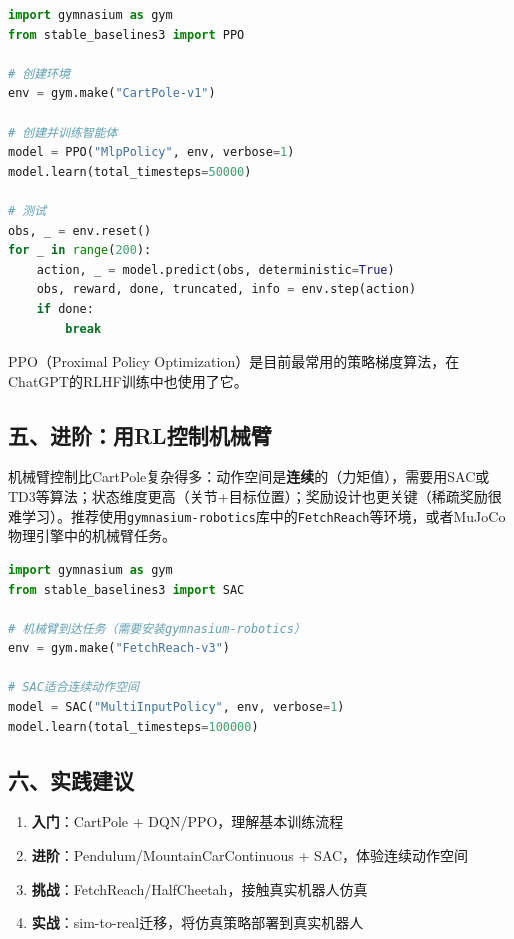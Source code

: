 \begin{lstlisting}[language=Python]
import gymnasium as gym
from stable_baselines3 import PPO

# 创建环境
env = gym.make("CartPole-v1")

# 创建并训练智能体
model = PPO("MlpPolicy", env, verbose=1)
model.learn(total_timesteps=50000)

# 测试
obs, _ = env.reset()
for _ in range(200):
    action, _ = model.predict(obs, deterministic=True)
    obs, reward, done, truncated, info = env.step(action)
    if done:
        break
\end{lstlisting}

PPO（Proximal Policy Optimization）是目前最常用的策略梯度算法，在ChatGPT的RLHF训练中也使用了它。

\subsection*{五、进阶：用RL控制机械臂}

机械臂控制比CartPole复杂得多：动作空间是\textbf{连续}的（力矩值），需要用SAC或TD3等算法；状态维度更高（关节+目标位置）；奖励设计也更关键（稀疏奖励很难学习）。推荐使用\texttt{gymnasium-robotics}库中的\texttt{FetchReach}等环境，或者MuJoCo物理引擎中的机械臂任务。

\begin{lstlisting}[language=Python]
import gymnasium as gym
from stable_baselines3 import SAC

# 机械臂到达任务（需要安装gymnasium-robotics）
env = gym.make("FetchReach-v3")

# SAC适合连续动作空间
model = SAC("MultiInputPolicy", env, verbose=1)
model.learn(total_timesteps=100000)
\end{lstlisting}

\subsection*{六、实践建议}

\begin{insightbox}[title=连续控制学习路线]
\begin{enumerate}
    \item \textbf{入门}：CartPole + DQN/PPO，理解基本训练流程
    \item \textbf{进阶}：Pendulum/MountainCarContinuous + SAC，体验连续动作空间
    \item \textbf{挑战}：FetchReach/HalfCheetah，接触真实机器人仿真
    \item \textbf{实战}：sim-to-real迁移，将仿真策略部署到真实机器人
\end{enumerate}
\end{insightbox}

